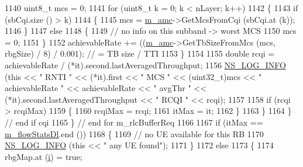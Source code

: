 \begin{DoxyCode}
1140                       uint8\_t mcs = 0;
1141                       \textcolor{keywordflow}{for} (uint8\_t k = 0; k < nLayer; k++)
1142                         \{
1143                           \textcolor{keywordflow}{if} (sbCqi.size () > k)
1144                             \{
1145                               mcs = \hyperlink{classns3_1_1PfFfMacScheduler_a8ed3fd6ae921b6161a10c2c9b0e869a4}{m\_amc}->GetMcsFromCqi (sbCqi.at (k));
1146                             \}
1147                           \textcolor{keywordflow}{else}
1148                             \{
1149                               \textcolor{comment}{// no info on this subband -> worst MCS}
1150                               mcs = 0;
1151                             \}
1152                           achievableRate += ((\hyperlink{classns3_1_1PfFfMacScheduler_a8ed3fd6ae921b6161a10c2c9b0e869a4}{m\_amc}->GetTbSizeFromMcs (mcs, rbgSize) / 8) / 0.001);   \textcolor{comment}{
      // = TB size / TTI}
1153                         \}
1154 
1155                       \textcolor{keywordtype}{double} rcqi = achievableRate / (*it).second.lastAveragedThroughput;
1156                       \hyperlink{group__logging_gafbd73ee2cf9f26b319f49086d8e860fb}{NS\_LOG\_INFO} (\textcolor{keyword}{this} << \textcolor{stringliteral}{" RNTI "} << (*it).first << \textcolor{stringliteral}{" MCS "} << (uint32\_t)mcs 
      << \textcolor{stringliteral}{" achievableRate "} << achievableRate << \textcolor{stringliteral}{" avgThr "} << (*it).second.lastAveragedThroughput << \textcolor{stringliteral}{" RCQI "} << 
      rcqi);
1157 
1158                       \textcolor{keywordflow}{if} (rcqi > rcqiMax)
1159                         \{
1160                           rcqiMax = rcqi;
1161                           itMax = it;
1162                         \}
1163                     \}
1164                 \}   \textcolor{comment}{// end if cqi}
1165             \} \textcolor{comment}{// end for m\_rlcBufferReq}
1166 
1167           \textcolor{keywordflow}{if} (itMax == \hyperlink{classns3_1_1PfFfMacScheduler_a00b148349167b85ab9170570e2530b92}{m\_flowStatsDl}.end ())
1168             \{
1169               \textcolor{comment}{// no UE available for this RB}
1170               \hyperlink{group__logging_gafbd73ee2cf9f26b319f49086d8e860fb}{NS\_LOG\_INFO} (\textcolor{keyword}{this} << \textcolor{stringliteral}{" any UE found"});
1171             \}
1172           \textcolor{keywordflow}{else}
1173             \{
1174               rbgMap.at (\hyperlink{bernuolliDistribution_8m_a6f6ccfcf58b31cb6412107d9d5281426}{i}) = \textcolor{keyword}{true};

\end{DoxyCode}
